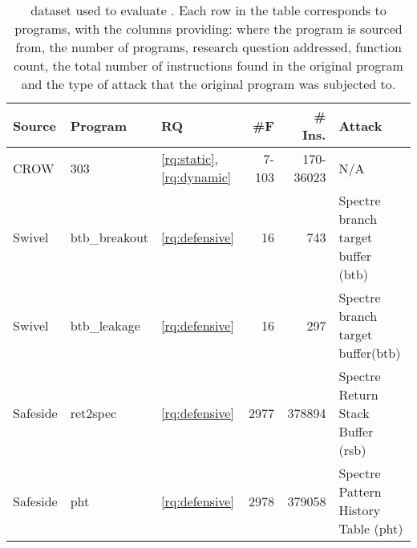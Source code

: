 
\begin{table}
\renewcommand\arraystretch{1.1}
\begin{adjustbox}{width=\linewidth,totalheight=\textheight, keepaspectratio}
    \begin{tabular}{p{1.5cm} | l | l | r | r | p{2cm}  }
        \hline
        Source & Program & RQ & \#F & \# Ins. & Attack  \\
        \hline \hline
        CROW \cite{arteaga2020crow} & 303 & \ref{rq:static}, \ref{rq:dynamic} & 7-103 & 170-36023 & N/A  \\
        \hline
        Swivel \cite{Swivel} & btb\_breakout & \ref{rq:defensive} & 16 & 743 & Spectre branch target buffer (btb)  \\
        \hline
        Swivel \cite{Swivel}  & btb\_leakage & \ref{rq:defensive} & 16 & 297 & Spectre branch target buffer(btb)  \\
        \hline
        Safeside \cite{Swivel, safeside}  & ret2spec & \ref{rq:defensive} & 2977 & 378894 & Spectre Return Stack Buffer (rsb)  \\
        \hline
        Safeside  \cite{Swivel, safeside} & pht & \ref{rq:defensive} & 2978 & 379058 & Spectre Pattern History Table (pht)  \\

    \end{tabular}
\end{adjustbox}
    
    \caption{\wasm dataset used to evaluate \tool. Each row in the table corresponds to programs, with the columns providing: where the program is sourced from, the number of programs, research question addressed, function count, the total number of instructions found in the original \wasm program and the type of attack that the original program was subjected to.}
    \label{tab:corpus}
\end{table}
